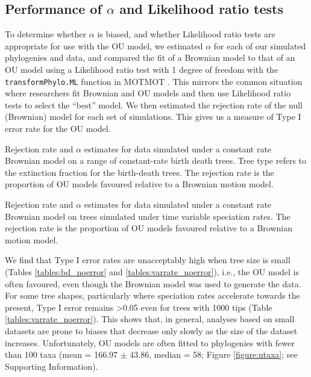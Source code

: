 \documentclass[a4paper,12pt]{article}
\begin{document}
  \subsection{Performance of $\alpha$ and Likelihood ratio tests}
    To determine whether $\alpha$ is biased, and whether Likelihood ratio tests are appropriate for use with the OU model, we estimated $\alpha$ for each of our simulated phylogenies and data, and compared the fit of a Brownian model to that of an OU model using a Likelihood ratio test with 1 degree of freedom with the \texttt{transformPhylo.ML} function in MOTMOT \citep{Thomas:2011aa}. 
    This mirrors the common situation where researchers fit Brownian and OU models and then use Likelihood ratio tests to select the ``best'' model.
    We then estimated the rejection rate of the null (Brownian) model for each set of simulations. 
    This gives us a measure of Type I error rate for the OU model.

      \begin{table}[!htbp]
        \begin{center}
        \caption{Rejection rate and $\alpha$ estimates for data simulated under a constant rate Brownian model on a range of constant-rate birth death trees. Tree type refers to the extinction fraction for the birth-death trees. The rejection rate is the proportion of OU models favoured relative to a Brownian motion model.}
        \bigskip
        
        \label{tables:bd_noerror}
        \end{center}
\end{table} 

      \begin{table}[!htbp]
        \begin{center}
        \caption{Rejection rate and $\alpha$ estimates for data simulated under a constant rate Brownian model on trees simulated under time variable speciation rates. The rejection rate is the proportion of OU models favoured relative to a Brownian motion model.}
        \bigskip
        
        \label{tables:varrate_noerror}
        \end{center}
\end{table} 

    We find that Type I error rates are unacceptably high when tree size is small (Tables \ref{tables:bd_noerror} and \ref{tables:varrate_noerror}), i.e., the OU model is often favoured, even though the Brownian model was used to generate the data. 
    For some tree shapes, particularly where speciation rates accelerate towards the present, Type I error remains \textgreater 0.05 even for trees with 1000 tips (Table \ref{tables:varrate_noerror}).
    This shows that, in general, analyses based on small datasets are prone to biases that decrease only slowly as the size of the dataset increases. 
    Unfortunately, OU models are often fitted to phylogenies with fewer than 100 taxa (mean = 166.97 $\pm$ 43.86, median = 58; Figure \ref{figure:ntaxa}; see Supporting Information). 
\end{document}
